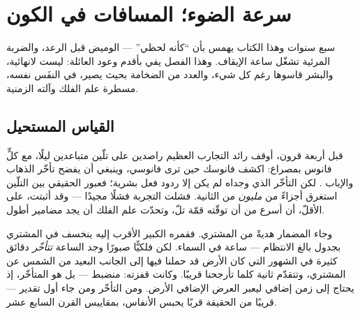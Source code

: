 \chapter{سرعة الضوء؛ المسافات في الكون}\label{ch:g8:speed-of-light}

سبع سنوات وهذا الكتاب يهمس بأن  ``كأنه لحظي'' --- الوميض
قبل الرعد، والضربة المرئية تشغّل ساعة الإيقاف. وهذا الفصل يفي
بأقدم وعود العائلة:   ليست لانهائية، والبشر قاسوها
رغم كل شيء، والعدد من الضخامة بحيث يصير، في النفَس نفسه، مسطرة
علم الفلك وآلته الزمنية.

\section{القياس المستحيل}

\begin{example}\label{ex:g8:speed-of-light:galileo}
قبل أربعة قرون، أوقف رائد التجارب العظيم راصدين على تلّين
متباعدين ليلًا، مع كلٍّ فانوس بمصراع: اكشف فانوسك حين ترى
فانوسي، وينبغي أن يفضح تأخّر الذهاب والإياب  . لكن
التأخّر الذي وجداه لم يكن إلا ردود فعل بشرية؛ فعبور 
الحقيقي بين التلّين استغرق أجزاءً من \emph{مليون} من الثانية.
فشلت التجربة فشلًا مجيدًا --- وقد أثبتت، على الأقلّ، أن 
أسرع من أن توقّته قمّة تلّ، وتحدّت علم الفلك أن يجد مضامير
أطول.
\end{example}

\begin{example}\label{ex:g8:speed-of-light:romer}
وجاء المضمار هديةً من المشتري. فقمره الكبير الأقرب إليه ينخسف
في  المشتري بجدول بالغ الانتظام --- ساعة في السماء. لكن
فلكيًّا صبورًا وجد الساعة \emph{تتأخّر} دقائق كثيرة في الشهور
التي كان  الأرض قد حملنا فيها إلى الجانب البعيد من الشمس
عن المشتري، وتتقدّم ثانية كلما تأرجحنا قريبًا. وكانت قفزته:
 منضبط --- بل \emph{} هو المتأخّر، إذ يحتاج إلى زمن
إضافي ليعبر العرض الإضافي  الأرض. ومن التأخّر ومن 
 جاء أول تقدير   --- قريبًا من الحقيقة قربًا
يحبس الأنفاس، بمقاييس القرن السابع عشر.
\end{example}


